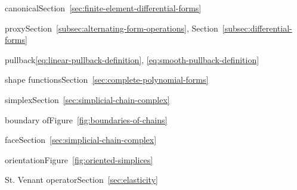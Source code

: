 \par\noindent\hspace*{1em}\label{index:projection-canonical}{canonical}\quad Section~\ref{sec:finite-element-differential-forms}

\par\noindent\hspace*{0em}\label{index:proxy}{proxy}\quad Section~\ref{subsec:alternating-form-operations}, Section~\ref{subsec:differential-forms}

\par\noindent\hspace*{0em}\label{index:pullback}{pullback}\quad \eqref{eq:linear-pullback-definition}, \eqref{eq:smooth-pullback-definition}

\par\noindent\hspace*{0em}\label{index:shape-functions}{shape functions}\quad Section~\ref{sec:complete-polynomial-forms}

\par\noindent\hspace*{0em}\label{index:simplex}{simplex}\quad Section~\ref{sec:simplicial-chain-complex}

\par\noindent\hspace*{1em}\label{index:simplex-boundary-of}{boundary of}\quad Figure~\ref{fig:boundaries-of-chains}

\par\noindent\hspace*{1em}\label{index:simplex-face}{face}\quad Section~\ref{sec:simplicial-chain-complex}

\par\noindent\hspace*{1em}\label{index:simplex-orientation}{orientation}\quad Figure~\ref{fig:oriented-simplices}

\par\noindent\hspace*{0em}\label{index:st-venant-operator}{St. Venant operator}\quad Section~\ref{sec:elasticity}


